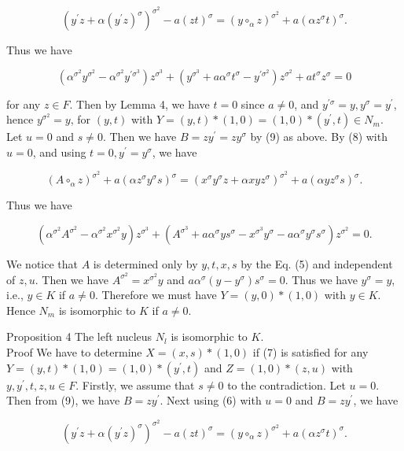 \documentclass[10pt]{article}
\begin{document}
$$
\left(y^{\prime} z+\alpha\left(y^{\prime} z\right)^{\sigma}\right)^{\sigma^{2}}-a(z t)^{\sigma}=\left(y \circ_{\alpha} z\right)^{\sigma^{2}}+a\left(\alpha z^{\sigma} t\right)^{\sigma} .
$$

Thus we have

$$
\left(\alpha^{\sigma^{2}} y^{\sigma^{2}}-\alpha^{\sigma^{2}} y^{\prime \sigma^{3}}\right) z^{\sigma^{3}}+\left(y^{\sigma^{3}}+a \alpha^{\sigma} t^{\sigma}-y^{\prime \sigma^{2}}\right) z^{\sigma^{2}}+a t^{\sigma} z^{\sigma}=0
$$

for any $z \in F$. Then by Lemma 4, we have $t=0$ since $a \neq 0$, and $y^{\prime \sigma}=y, y^{\sigma}=y^{\prime}$, hence $y^{\sigma^{2}}=y$, for $(y, t)$ with $Y=(y, t) *(1,0)=(1,0) *\left(y^{\prime}, t\right) \in N_{m}$. Let $u=0$ and $s \neq 0$. Then we have $B=z y^{\prime}=z y^{\sigma}$ by (9) as above. By (8) with $u=0$, and using $t=0, y^{\prime}=y^{\sigma}$, we have

$$
\left(A \circ_{\alpha} z\right)^{\sigma^{2}}+a\left(\alpha z^{\sigma} y^{\sigma} s\right)^{\sigma}=\left(x^{\sigma} y^{\sigma} z+\alpha x y z^{\sigma}\right)^{\sigma^{2}}+a\left(\alpha y z^{\sigma} s\right)^{\sigma} .
$$

Thus we have

$$
\left(\alpha^{\sigma^{2}} A^{\sigma^{2}}-\alpha^{\sigma^{2}} x^{\sigma^{2}} y\right) z^{\sigma^{3}}+\left(A^{\sigma^{3}}+a \alpha^{\sigma} y s^{\sigma}-x^{\sigma^{3}} y^{\sigma}-a \alpha^{\sigma} y^{\sigma} s^{\sigma}\right) z^{\sigma^{2}}=0 .
$$

We notice that $A$ is determined only by $y, t, x, s$ by the Eq. (5) and independent of $z, u$. Then we have $A^{\sigma^{2}}=x^{\sigma^{2}} y$ and $a \alpha^{\sigma}\left(y-y^{\sigma}\right) s^{\sigma}=0$. Thus we have $y^{\sigma}=y$, i.e., $y \in K$ if $a \neq 0$. Therefore we must have $Y=(y, 0) *(1,0)$ with $y \in K$. Hence $N_{m}$ is isomorphic to $K$ if $a \neq 0$.

Proposition 4 The left nucleus $N_{l}$ is isomorphic to $K$.\\
Proof We have to determine $X=(x, s) *(1,0)$ if (7) is satisfied for any $Y=(y, t) *(1,0)= (1,0) *\left(y^{\prime}, t\right)$ and $Z=(1,0) *(z, u)$ with $y, y^{\prime}, t, z, u \in F$. Firstly, we assume that $s \neq 0$ to the contradiction. Let $u=0$. Then from (9), we have $B=z y^{\prime}$. Next using (6) with $u=0$ and $B=z y^{\prime}$, we have

$$
\left(y^{\prime} z+\alpha\left(y^{\prime} z\right)^{\sigma}\right)^{\sigma^{2}}-a(z t)^{\sigma}=\left(y \circ_{\alpha} z\right)^{\sigma^{2}}+a\left(\alpha z^{\sigma} t\right)^{\sigma} .
$$
\end{document}
